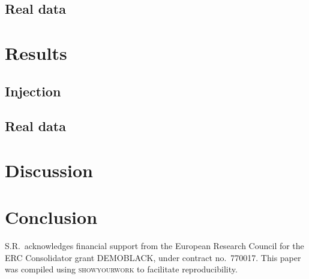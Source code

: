\documentclass[aps,prd,twocolumn,superscriptaddress,preprintnumbers,nofootinbib,hidelinks]{revtex4-2}
\begin{document}
\subsection{Real data}
\label{sec:real-data-setup}

\section{Results}
\label{sec:results}

\subsection{Injection}
\label{sec:injection-results}



\subsection{Real data}
\label{sec:real-data-results}



\section{Discussion}
\label{sec:discussion}



\section{Conclusion}
\label{sec:conclusion}

\begin{acknowledgments}

S.R.~acknowledges financial support from the European Research Council for the ERC Consolidator grant DEMOBLACK, under contract no.~770017.
This paper was compiled using \textsc{showyourwork} \cite{Luger2021} to facilitate reproducibility.

\end{acknowledgments}


\end{document}
